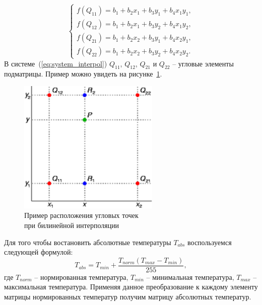 \documentclass[14pt, a4paper]{extreport}
\begin{document}
	\begin{equation}
	\begin{cases}
		f(Q_{11})=b_{1}+b_{2} x_{1}+b_{3} y_{1}+b_{4} x_{1} y_{1}, \\
		f(Q_{12})=b_{1}+b_{2} x_{1}+b_{3} y_{2}+b_{4} x_{1} y_{2}, \\
		f(Q_{21})=b_{1}+b_{2} x_{2}+b_{3} y_{1}+b_{4} x_{2} y_{1}, \\
		f(Q_{22})=b_{1}+b_{2} x_{2}+b_{3} y_{2}+b_{4} x_{2} y_{2}.
	\end{cases}
	\label{eq:system_interpol}
	\end{equation}
	В системе~(\ref{eq:system_interpol}) $Q_{11}$, $Q_{12}$, $Q_{21}$ и $Q_{22}$ -- угловые элементы подматрицы. Пример можно увидеть на рисунке~\ref{fig:Bilinear_interpolation}.
	\begin{figure}[h!]
		\centering
		\includegraphics[width = 0.6\textwidth]{image/chapter_2/Bilinear_interpolation}	
		\caption{Пример расположения угловых точек \\при билинейной интерполяции}
		\label{fig:Bilinear_interpolation}
	\end{figure}
	Для того чтобы востановить абсолютные температуры $T_{abs}$ воспользуемся следующей формулой:
	\begin{equation*}
		T_{abs} = T_{min} + \frac{T_{norm}(T_{max} - T_{min})}{255},
		\label{eq:T_abs}
	\end{equation*}
	где $T_{norm}$ -- нормированная температура, $T_{min}$ -- минимальная температура, $T_{max}$ -- максимальная температура. Применяя данное преобразование к каждому элементу матрицы нормированных температур получим матрицу абсолютных температур.
	
\end{document}
